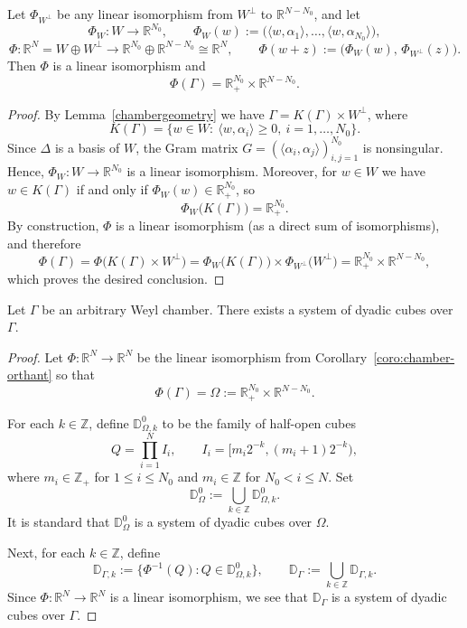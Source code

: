 \documentclass[12pt]{amsart}
\begin{document}
\begin{coro}\label{coro:chamber-orthant}
Let $\Phi_{W^{\perp}}$ be any linear isomorphism from $W^\perp$ to $\mathbb{R}^{N-N_{0}}$, and let
\[
\Phi_W:W\longrightarrow\mathbb{R}^{N_{0}},
\qquad
\Phi_W(w):=\big(\langle w,\alpha_1\rangle,\dots,\langle w,\alpha_{N_{0}}\rangle\big),
\]
\[
\Phi:\mathbb{R}^N=W\oplus W^\perp\longrightarrow
\mathbb{R}^{N_{0}}\oplus\mathbb{R}^{N-N_{0}}\cong\mathbb{R}^N,
\qquad
\Phi(w+z):=\big(\Phi_W(w),\,\Phi_{W^\perp}(z)\big).
\]
Then $\Phi$ is a linear isomorphism and
\[
\Phi(\Gamma)=\mathbb{R}_+^{N_{0}}\times \mathbb{R}^{N-N_{0}}.
\]
\end{coro}

\begin{proof}
By Lemma~\ref{chambergeometry} we have $\Gamma=K(\Gamma)\times W^\perp$, where
\[
K(\Gamma)=\{w\in W:\ \langle w,\alpha_i\rangle\ge0,\ i=1,\dots,N_{0}\}.
\]
Since $\Delta$ is a basis of $W$, the Gram matrix
$G=(\langle \alpha_i,\alpha_j\rangle)_{i,j=1}^{N_{0}}$ is nonsingular. Hence,
$\Phi_W:W\longrightarrow\mathbb{R}^{N_{0}}$ is a linear isomorphism. Moreover,
for $w\in W$ we have $w\in K(\Gamma)$ if and only if $\Phi_{W}(w)\in\mathbb{R}_+^{N_{0}}$,
so
\[
\Phi_{W}\big(K(\Gamma)\big)=\mathbb{R}_+^{N_{0}}.
\]
By construction, $\Phi$ is a linear isomorphism (as a direct sum of isomorphisms),
and therefore
\[
\Phi(\Gamma)
=\Phi\big(K(\Gamma)\times W^\perp\big)
=\Phi_{W}\big(K(\Gamma)\big)\times \Phi_{W^{\perp}}\big(W^\perp\big)
=\mathbb{R}_+^{N_{0}}\times \mathbb{R}^{N-N_{0}},
\]
which proves the desired conclusion.
\end{proof}


\begin{coro}\label{Construction over gamma}
 Let $\Gamma$ be an arbitrary Weyl chamber. There exists a system of dyadic cubes over $\Gamma$.
\end{coro}\begin{proof}
Let $\Phi:\mathbb{R}^N\to\mathbb{R}^N$ be the linear isomorphism from Corollary~\ref{coro:chamber-orthant} so that
\[
\Phi(\Gamma)=\Omega:=\mathbb{R}_+^{N_0}\times \mathbb{R}^{N-N_0}.
\]

For each $k\in\mathbb{Z}$, define $\mathbb{D}^0_{\Omega,k}$ to be the family of half-open cubes
\[
Q=\prod_{i=1}^{N} I_i,
\qquad
I_i=\big[m_i2^{-k},(m_i+1)2^{-k}\big),
\]
where $m_i\in\mathbb{Z}_+$ for $1\le i\le N_0$ and $m_i\in\mathbb{Z}$ for $N_0<i\le N$. Set
\[
\mathbb{D}^0_\Omega:=\bigcup_{k\in\mathbb{Z}}\mathbb{D}^0_{\Omega,k}.
\]
It is standard that $\mathbb{D}^0_\Omega$ is a system of dyadic cubes over $\Omega$.

Next, for each $k\in\mathbb{Z}$, define
\[
\mathbb{D}_{\Gamma,k}:=\big\{\Phi^{-1}(Q): Q\in \mathbb{D}^0_{\Omega,k}\big\},
\qquad
\mathbb{D}_{\Gamma}:=\bigcup_{k\in\mathbb{Z}}\mathbb{D}_{\Gamma,k}.
\]
Since $\Phi:\mathbb{R}^N\to\mathbb{R}^N$ is a linear isomorphism, we see that $\mathbb{D}_{\Gamma}$ is a system of dyadic cubes over $\Gamma$.
\end{proof}
\end{document}

